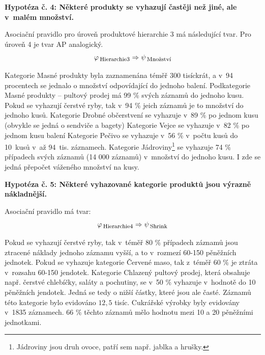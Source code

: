 
\textbf{Hypotéza č. 4: Některé produkty se vyhazují častěji než jiné, ale v~malém množství.}

Asociační pravidlo pro úroveň produktové hierarchie 3 má následující tvar. Pro úroveň 4 je tvar AP analogický.
\begin{equation}
    \varphi_{\mbox{\,\footnotesize Hierarchie3}} \Rightarrow \psi_{\mbox{\,\footnotesize Množství}}
\end{equation}

Kategorie Masné produkty byla zaznamenána téměř 300 tisíckrát, a v~94 procentech se jednalo o množství odpovídající do jednoho balení. Podkategorie Masné produkty -- pultový prodej má 99 \% svých záznamů do jednoho kusu.
Pokud se vyhazují čerstvé ryby, tak v~94 \% jeich záznamů je to množství do jednoho kusů. Kategorie Drobné občerstvení %
 se vyhazuje v~89 \% po jednom kusu (obvykle se jedná o sendviče a bagety)
Kategorie Vejce se vyhazuje v~82 \% po jednom kusu balení
Kategorie Pečivo se vyhazuje v~56 \% v~počtu kusů do 10~kusů v~až 94~tis. záznamech.
Kategorie Jádroviny\footnote{Jádroviny jsou druh ovoce, patří sem např. jablka a hrušky.} se vyhazuje 74 \% případech svých záznamů (14 000 záznamů) v~množství do jednoho kusu. I zde se jedná přepočet váženého množství na kusy.

\vspace*{1em}

\textbf{Hypotéza č. 5: Některé vyhazované kategorie produktů jsou výrazně nákladnější.}

Asociační pravidlo má tvar:
\begin{equation}
    \varphi_{\mbox{\,\footnotesize Hierarchie4}} \Rightarrow \psi_{\mbox{\,\footnotesize Shrink}}
\end{equation}

Pokud se vyhazují čerstvé ryby, tak v~téměř 80 \% případech záznamů jsou ztracené náklady jednoho záznamu vyšší, a to v~rozmezí 60-150 pěněžních jednotek.
Pokud se vyhazuje kategorie Červené maso, tak z~téměř 60 \% je ztráta v~rozsahu 60-150 jendotek.
Kategorie Chlazený pultový prodej, která obsahuje např. čerstvé chlebíčky, saláty a pochutiny, se v~50 \% vyhazuje v~hodnotě do 10 pěněžních jendotek. Jedná se tedy o nižší částky, které jsou ale časté. Záznamů této kategorie bylo evidováno $12{,}5$ tisíc.
Cukrářské výrobky byly evidovány v~1835 záznamech. 66 \% těchto záznamů mělo hodnotu mezi 10 a 20 pěněžními jednotkami.

